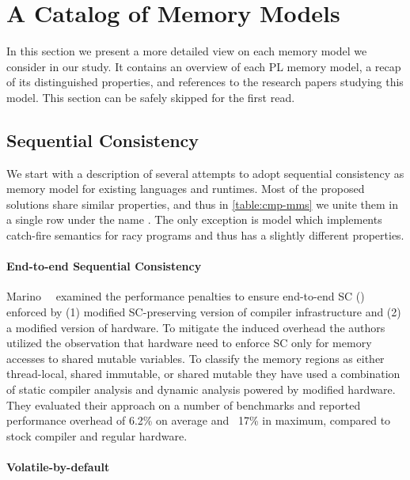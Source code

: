 \section{A Catalog of Memory Models}
\label{sec:catalog}

In this section we present a more detailed view 
on each memory model we consider in our study. 
It contains an overview of each PL memory model,
a recap of its distinguished properties,
and references to the research papers studying this model. 
This section can be safely skipped for the first read.





\subsection{Sequential Consistency}
\label{sec:catalog:sc}

We start with a description of several attempts 
to adopt sequential consistency as memory model for 
existing languages and runtimes. 
Most of the proposed solutions share similar properties, 
and thus in \cref{table:cmp-mms} we unite them 
in a single row under the name \SC. 
The only exception is \DRFx model which implements
catch-fire semantics for racy programs 
and thus has a slightly different properties. 

\paragraph{End-to-end Sequential Consistency}

Marino~\etal~\cite{Marino-al:PLDI11, Singh-al:ISCA12} 
examined the performance penalties to ensure end-to-end SC (\EtESC)
enforced by (1) modified SC-preserving version 
of \LLVM compiler infrastructure and 
(2) a modified version of \Intel hardware. 
To mitigate the induced overhead the authors 
utilized the observation that hardware need to 
enforce SC only for memory accesses to shared mutable variables. 
To classify the memory regions as either thread-local,
shared immutable, or shared mutable they have used 
a combination of static compiler analysis and 
dynamic analysis powered by modified hardware. 
They evaluated their approach on a number of benchmarks
and reported performance overhead of 6.2\% on average 
and ~17\% in maximum, compared to stock \LLVM compiler 
and regular \Intel hardware. 

\paragraph{Volatile-by-default}

